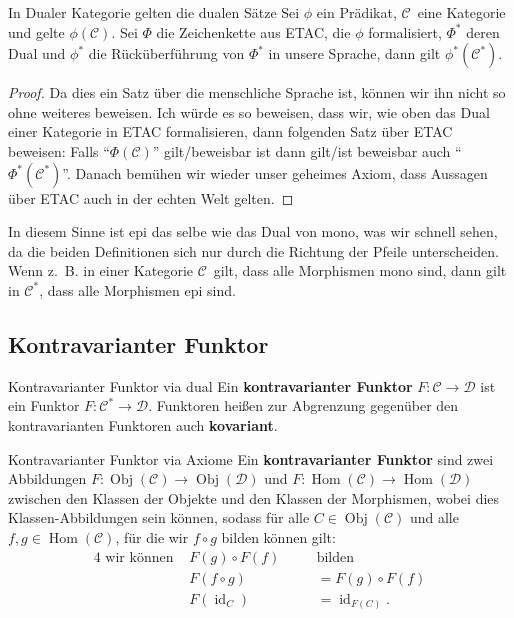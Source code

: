 \documentclass[a4paper]{amsart}
\theoremstyle{definition}
\DeclareMathOperator{\id}{id}
\DeclareMathOperator{\Hom}{Hom}
\DeclareMathOperator{\Obj}{Obj}
\newcommand{\CC}{\ensuremath{\mathcal{ C }}}
\newcommand{\DD}{\ensuremath{\mathcal{ D }}}
\newcommand{\zb}{z.~B. }
\begin{document}
\begin{Satz}{In Dualer Kategorie gelten die dualen Sätze}
   Sei $\phi$ ein Prädikat, \CC\ eine Kategorie und gelte $\phi(\CC)$. Sei $\Phi$ die Zeichenkette aus ETAC, die $\phi$ formalisiert, $\Phi^*$ deren Dual und $\phi^*$ die Rücküberführung von $\Phi^*$ in unsere Sprache, dann gilt $\phi^*(\CC^*)$.
\end{Satz}
\begin{proof}
   Da dies ein Satz über die menschliche Sprache ist, können wir ihn nicht so ohne weiteres beweisen. Ich würde es so beweisen, dass wir, wie oben das  Dual einer Kategorie in ETAC formalisieren, dann folgenden Satz über ETAC beweisen: Falls "`$\Phi(\CC)$"' gilt/beweisbar ist dann gilt/ist beweisbar auch "`$\Phi^*(\CC^*)$"'. Danach bemühen wir wieder unser geheimes Axiom, dass Aussagen über ETAC auch in der echten Welt gelten.
\end{proof}

In diesem Sinne ist epi das selbe wie das Dual von mono, was wir schnell sehen, da die beiden Definitionen sich nur durch die Richtung der Pfeile unterscheiden. Wenn \zb in einer Kategorie \CC\ gilt, dass alle Morphismen mono sind, dann gilt in $\CC^*$, dass alle Morphismen epi sind.

\subsection{Kontravarianter Funktor}
\begin{Definition}{Kontravarianter Funktor via dual}
   Ein \textbf{kontravarianter Funktor} $F \colon \CC \to \DD$ ist ein Funktor $F \colon \CC^* \to \DD$. Funktoren heißen zur Abgrenzung gegenüber den kontravarianten Funktoren auch \textbf{kovariant}. 
\end{Definition}   

\begin{Definition}{Kontravarianter Funktor via Axiome}
   Ein \textbf{kontravarianter Funktor} sind zwei Abbildungen $F \colon \Obj( \CC ) \to \Obj( \DD )$ und $F \colon \Hom( \CC ) \to \Hom( \DD )$ zwischen den Klassen der Objekte und den Klassen der Morphismen, wobei dies Klassen-Abbildungen sein können, sodass für alle $C \in \Obj(\CC)$ und alle $f, g \in \Hom( \CC )$, für die wir $f \circ g$ bilden können gilt:
   \begin{alignat}{4}
      \text{ wir können } &F(g) \circ F(f) \quad &&\text{bilden}\\
      &F( f \circ g ) &&= F(g) \circ F(f)\\
      &F( \id_C) &&= \id_{F(C)}.
   \end{alignat} 
\end{Definition}
   
\end{document}
